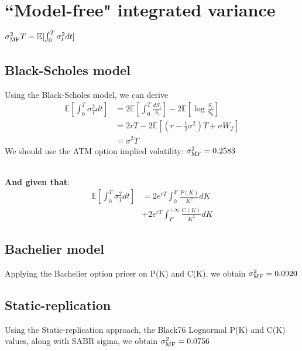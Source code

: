 \documentclass{article}
\begin{document}
\section{``Model-free" integrated   variance  $\sigma^2_{\textnormal{MF}}T=\mathbb{E}[\int_{0}^{T} {\sigma^2_t dt}]$}
\begin{minipage}[t]{0.5\textwidth}
	\begin{tcolorbox}[height=8cm,boxsep=5pt,arc=0pt,auto outer arc,colback=white,colframe=black]
\subsection{Black-Scholes model}
Using the Black-Scholes model, we can derive  
\begin{align*}
\mathbb{E}[\int_{0}^{T}{\sigma^2_T dt}]&=2\mathbb{E}[\int_{0}^{T}\frac{dS_t}{S_t}]-2\mathbb{E}[\log{\frac{S_t}{S_0}}]\\
&=2rT-2\mathbb{E}[(r-\frac{1}{2} \sigma^2 )T + \sigma W_T]\\
&=\sigma^{2}T
\end{align*}
We should use the ATM option implied volatility:  $\sigma^2_{\textnormal{MF}}=0.2583$ \\ \\
	\end{tcolorbox}
\end{minipage}
\begin{minipage}[t]{0.5\textwidth}
	\begin{tcolorbox}[height=8cm,boxsep=5pt,arc=0pt,auto outer arc,colback=white,colframe=black]
\textbf{And given that}:
\begin{align*}
\mathbb{E}[\int_{0}^{T}{\sigma^2_T dt}]&=2e^{rT}\int_{0}^{F}{\frac{P(K)}{K^2}dK}\\
&+2e^{rT}\int_{F}^{+\infty}{\frac{C(K)}{K^2}dK}
\end{align*}
\subsection{Bachelier model}
Applying the Bachelier option pricer on P(K) and C(K), we obtain $\sigma^2_{\textnormal{MF}}=0.0920$ 

\subsection{Static-replication}
Using the Static-replication approach, the Black76 Lognormal P(K) and C(K) values, along with SABR sigma, we obtain $\sigma^2_{\textnormal{MF}}=0.0756$ 
	\end{tcolorbox}
\end{minipage}
\end{document}
